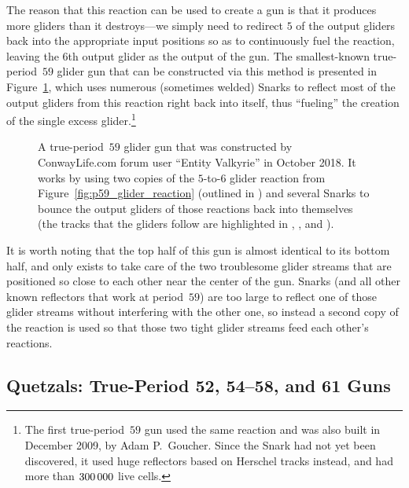 The reason that this reaction can be used to create a gun is that it produces more gliders than it destroys---we simply need to redirect $5$ of the output gliders back into the appropriate input positions so as to continuously fuel the reaction, leaving the $6$th output glider as the output of the gun. The smallest-known true-period~$59$ glider gun that can be constructed via this method is presented in Figure~\ref{fig:p59_glider_gun}, which uses numerous (sometimes welded) Snarks to reflect most of the output gliders from this reaction right back into itself, thus ``fueling'' the creation of the single excess glider.\footnote{The first true-period~$59$ gun used the same reaction and was also built in December 2009, by Adam P.~Goucher. Since the Snark had not yet been discovered, it used huge reflectors based on Herschel tracks instead, and had more than $300{\,}000$ live cells.}

\begin{figure}[!htb]
	\centering
	\caption{A true-period~$59$ glider gun that was constructed by ConwayLife.com forum user ``Entity Valkyrie'' in October 2018. It works by using two copies of the $5$-to-$6$ glider reaction from Figure~\ref{fig:p59_glider_reaction} (outlined in ) and several Snarks to bounce the output gliders of those reactions back into themselves (the tracks that the gliders follow are highlighted in , , and ).}\label{fig:p59_glider_gun}
\end{figure}

It is worth noting that the top half of this gun is almost identical to its bottom half, and only exists to take care of the two troublesome glider streams that are positioned so close to each other near the center of the gun. Snarks (and all other known reflectors that work at period~$59$) are too large to reflect one of those glider streams without interfering with the other one, so instead a second copy of the reaction is used so that those two tight glider streams feed each other's reactions.


\subsection{Quetzals: True-Period 52, 54--58, and 61 Guns}\label{sec:true_period_guns_p57}

